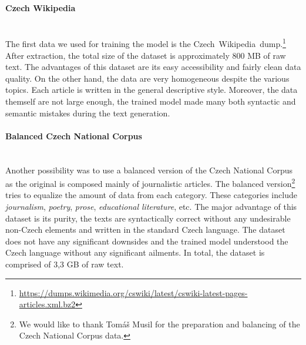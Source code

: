 \paragraph*{Czech Wikipedia} ~\\
\indent The first data we used for training the model is the Czech~Wikipedia~dump.\footnote[3]{\url{https://dumps.wikimedia.org/cswiki/latest/cswiki-latest-pages-articles.xml.bz2}} After extraction, the total size of the dataset is approximately 800 MB of raw text. The advantages of this dataset are its easy accessibility and fairly clean data quality. On the other hand, the data are very homogeneous despite the various topics. Each article is written in the general descriptive style. Moreover, the data themself are not large enough, the trained model made many both syntactic and semantic mistakes during the text generation.

\paragraph*{Balanced Czech National Corpus} ~\\
\indent Another possibility was to use a balanced version of the Czech National Corpus\citep{11234/1-4635} as the original is composed mainly of journalistic articles. The balanced version\footnote[4]{We would like to thank Tomáš Musil for the preparation and balancing of the Czech National Corpus data.} tries to equalize the amount of data from each category. These categories include \textit{journalism}, \textit{poetry}, \textit{prose}, \textit{educational literature}, etc. The major advantage of this dataset is its purity, the texts are syntactically correct without any undesirable non-Czech elements and written in the standard Czech language. The dataset does not have any significant downsides and the trained model understood the Czech language without any significant ailments. In total, the dataset is comprised of 3,3 GB of raw text.

